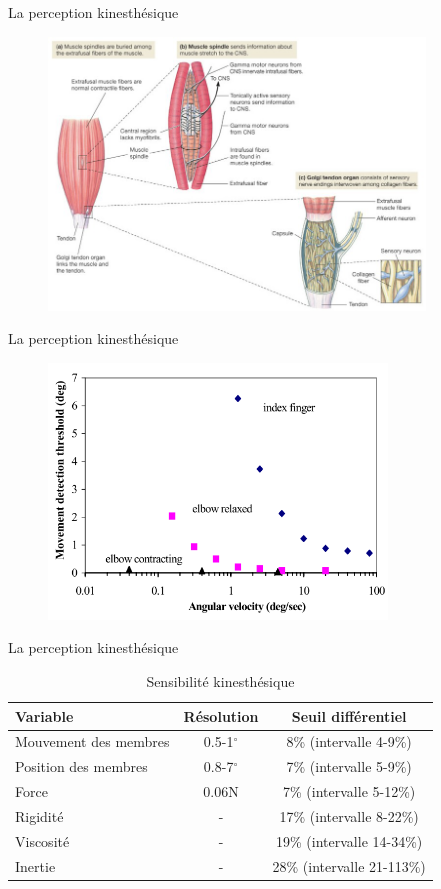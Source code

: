 \documentclass[compress, noflama]{beamer}
\begin{document}
{
\begin{frame}{La perception kinesthésique}
\begin{figure}
\centering
\includegraphics[width=10cm]{images/muscles}
\end{figure}
\end{frame}
}

{
\begin{frame}{La perception kinesthésique}
\begin{figure}
\centering
\includegraphics[width=9cm]{images/jnd_position}
\end{figure}
\end{frame}

\begin{frame}{La perception kinesthésique}
\begin{table}[]
\centering
\footnotesize
	\begin{tabular}[]{lcc}
		\toprule
		\textbf{Variable} & \textbf{Résolution} & \textbf{Seuil différentiel}\\
		\midrule
		Mouvement des membres & 0.5-1$^{\circ}$ & 8\% (intervalle 4-9\%)\\
		Position des membres & 0.8-7$^{\circ}$ & 7\% (intervalle 5-9\%)\\
		Force & 0.06N & 7\% (intervalle 5-12\%)\\
		Rigidité & - & 17\% (intervalle 8-22\%)\\
		Viscosité & - & 19\% (intervalle 14-34\%)\\
		Inertie & - & 28\% (intervalle 21-113\%)\\
		\bottomrule
	\end{tabular}
	\caption{Sensibilité kinesthésique}
\end{table}
\end{frame}
}
\end{document}

